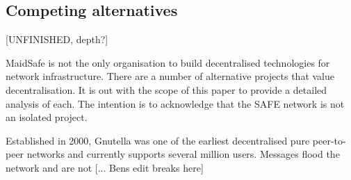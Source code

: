 \documentclass[twocolumn,english]{article}
\begin{document}
%
%

\subsection{Competing alternatives}
[UNFINISHED, depth?]

MaidSafe is not the only organisation to build decentralised technologies for network infrastructure.  There are a number of alternative projects that value decentralisation. It is out with the scope of this paper to provide a detailed analysis of each.  The intention is to acknowledge that 
the SAFE network is not an isolated project. %

Established in 2000, Gnutella was one of the earliest decentralised pure peer-to-peer networks and currently supports several million users.  Messages flood the network and are not [... Bens edit breaks here]
\end{document}
